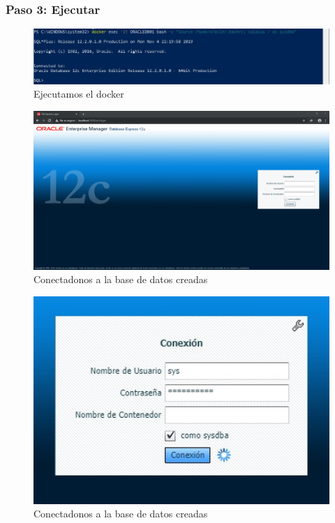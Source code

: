 \documentclass[preprint,12pt]{elsarticle}
\begin{document}
\subsubsection{\textbf{Paso 3: Ejecutar}}
\begin{figure}[H]
	\begin{center}
		\includegraphics[width=12cm]{./IMAGENES/foto12} 
		\caption{Ejecutamos el docker}
	\end{center}
\end{figure}

\begin{figure}[H]
	\begin{center}
		\includegraphics[width=12cm]{./IMAGENES/foto13} 
		\caption{Conectadonos a la base de datos creadas}
	\end{center}
\end{figure}

\begin{figure}[H]
	\begin{center}
		\includegraphics[width=12cm]{./IMAGENES/foto14} 
		\caption{Conectadonos a la base de datos creadas}
	\end{center}
\end{figure}
\end{document}
